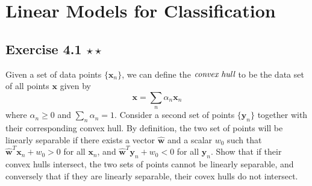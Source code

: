 \chapter{Linear Models for Classification}

\section*{Exercise 4.1 $\star \star$}
Given a set of data points $\{\mathbf{x}_n\}$, we can define the
$\emph{convex hull}$ to be the data set of all points 
$\mathbf{x}$ given by
\begin{equation*}
    \mathbf{x} = \sum_{n} \alpha_n \mathbf{x}_n
    \tag{4.156}\label{eq:4.156}
\end{equation*}
where $\alpha_n \geq 0$ and $\sum_{n} \alpha_n = 1$. Consider
a second set of points $\{\mathbf{y}_n\}$ together with
their corresponding convex hull. By definition,
the two set of points will be linearly separable
if there exists a vector $\widehat{\mathbf{w}}$ and
a scalar $w_0$ such that $\widehat{\mathbf{w}}^T\mathbf{x}_n + w_0 > 0$
for all $\mathbf{x}_n$, and $\widehat{\mathbf{w}}^T\mathbf{y}_n + w_0 < 0$
for all $\mathbf{y}_n$. Show that if their convex hulls intersect,
the two sets of points cannot be linearly separable, and conversely
that if they are linearly separable, their covex hulls do not intersect.

\vspace{1em}

